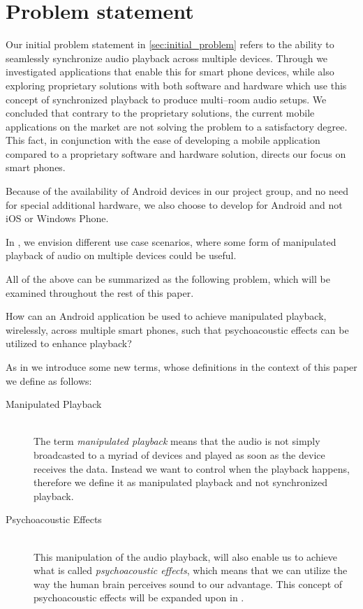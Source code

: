 \chapter{Problem statement}\label{cha:problem_statement}
Our initial problem statement in \cref{sec:initial_problem} refers to the ability to seamlessly synchronize audio playback across multiple devices.
Through  we investigated applications that enable this for smart phone devices, while also exploring proprietary solutions with both software and hardware which use this concept of synchronized playback to produce multi--room audio setups.
We concluded that contrary to the proprietary solutions, the current mobile applications on the market are not solving the problem to a satisfactory degree.
This fact, in conjunction with the ease of developing a mobile application compared to a proprietary software and hardware solution, directs our focus on smart phones.

Because of the availability of Android devices in our project group, and no need for special additional hardware, we also choose to develop for Android and not iOS or Windows Phone.

In , we envision different use case scenarios, where some form of manipulated playback of audio on multiple devices could be useful.

\bigskip
All of the above can be summarized as the following problem, which will be examined throughout the rest of this paper.

\begin{problemstatement}
    How can an Android application be used to achieve manipulated playback, wirelessly, across multiple smart phones, such that psychoacoustic effects can be utilized to enhance playback?
\end{problemstatement}

\noindent
As in  we introduce some new terms, whose definitions in the context of this paper we define as follows:

\begin{description}
    \item[Manipulated Playback] \hfill \\
        The term \textit{manipulated playback} means that the audio is not simply broadcasted to a myriad of devices and played as soon as the device receives the data.
        Instead we want to control when the playback happens, therefore we define it as manipulated playback and not synchronized playback.
    \item[Psychoacoustic Effects] \hfill \\
        This manipulation of the audio playback, will also enable us to achieve what is called \textit{psychoacoustic effects}, which means that we can utilize the way the human brain perceives sound to our advantage.
        This concept of psychoacoustic effects will be expanded upon in .
\end{description}
